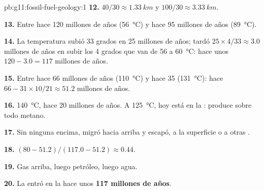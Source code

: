\begin{solution}{pb:g11:fossil-fuel-geology:1}
\textbf{12.} $40/30 \approx \qty{1.33}{km}$ y $100/30 \approx
\qty{3.33}{km}$.

\textbf{13.} Entre hace 120 millones de años (\qty{56}{\degreeCelsius}) y
hace 95 millones de años (\qty{89}{\degreeCelsius}).

\textbf{14.} La temperatura subió 33 grados en 25 millones de años; tardó
$25 \times 4/33 \approx 3.0$ millones de años en subir los 4 grados que van de
\num{56} a \qty{60}{\degreeCelsius}: hace unos $120 - 3.0 = 117$ millones de
años.

\textbf{15.} Entre hace 66 millones de años (\qty{110}{\degreeCelsius}) y
hace 35 (\qty{131}{\degreeCelsius}): hace $66 - 31 \times 10/21 \approx 51.2$
millones de años.

\textbf{16.} \qty{140}{\degreeCelsius}, hace 20 millones de años. A
\qty{125}{\degreeCelsius}, hoy está en la : produce sobre todo
metano.

\textbf{17.} Sin ninguna  encima, migró hacia arriba y escapó, a la
superficie o a otras .

\textbf{18.} $(80 - 51.2)/(117.0 - 51.2) \approx 0.44$.

\textbf{19.} Gas arriba, luego petróleo, luego agua.

\textbf{20.} La  entró en la  hace unos
\textbf{117 millones de años}.
\end{solution}

